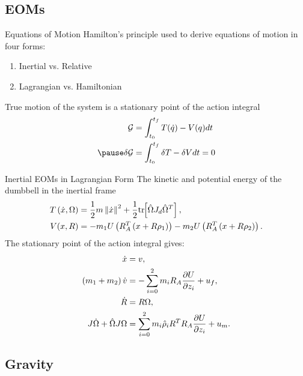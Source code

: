 \subsection{EOMs}



\begin{frame}{Equations of Motion}
    Hamilton's principle used to derive equations of motion in four forms:
    \begin{enumerate}
        \item Inertial vs. Relative 
        \item Lagrangian vs. Hamiltonian
    \end{enumerate}
    True motion of the system is a stationary point of the action integral
    \begin{align*}
        \mathcal{G} &= \int_{t_0}^{t_f} T(\dot q) - V(q) dt\\
        \pause
        \delta \mathcal{G} &= \int_{t_0}^{t_f} \delta T - \delta V dt = 0
    \end{align*}
\end{frame}

\begin{frame}{Inertial EOMs in Lagrangian Form}
    The kinetic and potential energy of the dumbbell in the inertial frame
    \begin{align*}
        T\left( \dot{x}, \Omega \right) &= \frac{1}{2} m \left\| \dot{x} \right\|^2 + \frac{1}{2} \mathrm{tr}\negthickspace\left[ \hat{\Omega} J_d \hat{\Omega}^T \right] , \\
        V( x, R ) &=  - m_1 U \left( R_A^T \left( x + R \rho_1 \right) \right) - m_2 U \left( R_A^T \left( x + R \rho_2 \right) \right). 
    \end{align*}
    \pause
    The stationary point of the action integral gives:
    \begin{align*}
        \dot{x} &= v, \\
        \left( m_1 + m_2 \right) \dot{v} &= - \sum_{i=0}^2 m_i R_A \frac{\partial U}{\partial z_i} + u_f, \\
        \dot{R} &= R \Omega, \\
        J \dot{\Omega} + \hat{\Omega} J \Omega &= \sum_{i=0}^2 m_i \hat{\rho}_i R^T R_A \frac{\partial U}{\partial z_i} + u_m. 
    \end{align*}
\end{frame}

\subsection{Gravity}


